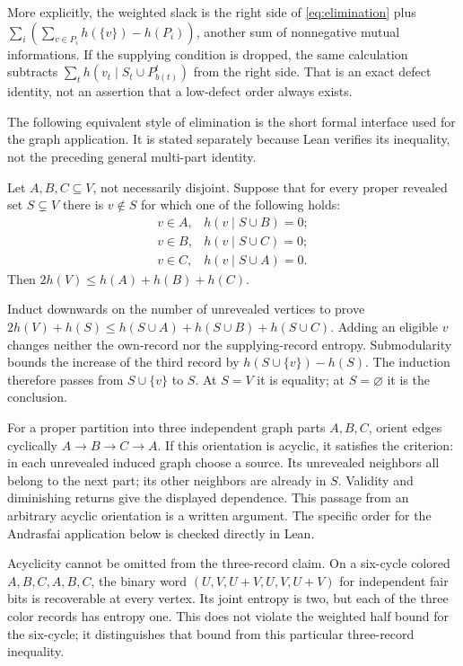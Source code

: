 More explicitly, the weighted slack is the right side of
\eqref{eq:elimination} plus
$\sum_i(\sum_{v\in P_i}h(\{v\})-h(P_i))$, another sum of nonnegative
mutual informations. If the supplying condition is dropped, the same
calculation subtracts $\sum_t h(v_t\mid S_t\cup P_{b(t)}^t)$ from
the right side. That is an exact defect identity, not an assertion
that a low-defect order always exists.

The following equivalent style of elimination is the short formal
interface used for the graph application. It is stated separately
because Lean verifies its inequality, not the preceding general
multi-part identity.

\begin{lemma}\label{lem:three-part}
Let $A,B,C\subseteq V$, not necessarily disjoint. Suppose that for
every proper revealed set $S\subsetneq V$ there is $v\notin S$ for
which one of the following holds:
\[
 \begin{array}{ll}
 v\in A,&h(v\mid S\cup B)=0;\\
 v\in B,&h(v\mid S\cup C)=0;\\
 v\in C,&h(v\mid S\cup A)=0.
 \end{array}
\]
Then $2h(V)\le h(A)+h(B)+h(C)$.
\end{lemma}
\begin{outline}
Induct downwards on the number of unrevealed vertices to prove
$2h(V)+h(S)\le h(S\cup A)+h(S\cup B)+h(S\cup C)$.
Adding an eligible $v$ changes neither the own-record nor the
supplying-record entropy. Submodularity bounds the increase of the
third record by $h(S\cup\{v\})-h(S)$.
The induction therefore passes from $S\cup\{v\}$ to $S$.
At $S=V$ it is equality; at $S=\varnothing$ it is the conclusion.
\end{outline}

For a proper partition into three independent graph parts $A,B,C$,
orient edges cyclically $A\to B\to C\to A$. If this orientation is
acyclic, it satisfies the criterion: in each unrevealed induced graph
choose a source. Its unrevealed neighbors all belong to the next part;
its other neighbors are already in $S$. Validity and diminishing
returns give the displayed dependence. This passage from an arbitrary
acyclic orientation is a written argument. The specific order for the
Andrasfai application below is checked directly in Lean.

Acyclicity cannot be omitted from the three-record claim. On a six-cycle
colored $A,B,C,A,B,C$, the binary word
$(U,V,U+V,U,V,U+V)$ for independent fair bits is recoverable at every
vertex. Its joint entropy is two, but each of the three color records
has entropy one. This does not violate the weighted half bound for
the six-cycle; it distinguishes that bound from this particular
three-record inequality.

